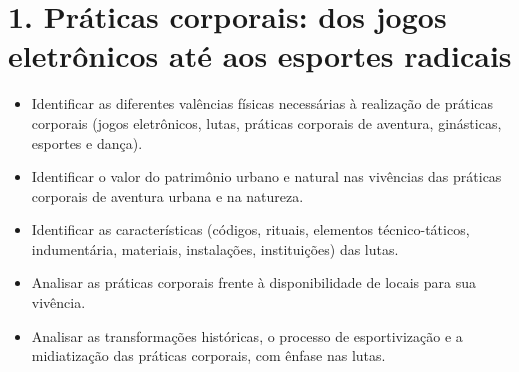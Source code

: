 \blankpage


\chapter{1. Práticas corporais: dos jogos eletrônicos até aos esportes radicais}

\vspace*{-2\baselineskip}



\begin{itemize}
\item
  Identificar as diferentes valências físicas necessárias
  à realização de práticas corporais (jogos eletrônicos, lutas, práticas
  corporais de aventura, ginásticas, esportes e dança).
\item
  Identificar o valor do patrimônio urbano e natural nas vivências das
  práticas corporais de aventura urbana e na natureza.
\item
  Identificar as características (códigos, rituais, elementos
  técnico-táticos, indumentária, materiais, instalações, instituições)
  das lutas.
\item
  Analisar as práticas corporais frente à disponibilidade de locais para
  sua vivência.
\item
  Analisar as transformações históricas, o processo de esportivização e
  a midiatização das práticas corporais, com ênfase nas lutas.
\end{itemize}

\reversemarginpar{}

